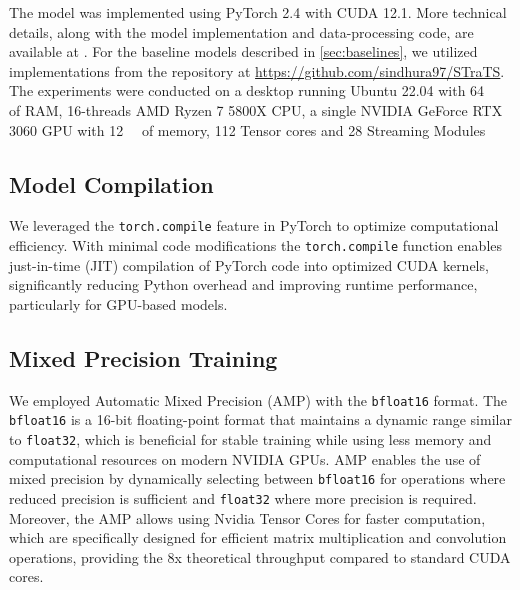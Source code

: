 The model was implemented using PyTorch 2.4 with CUDA 12.1. More technical details, along with the model implementation and data-processing code, are available at . For the baseline models described in \cref{sec:baselines}, we utilized implementations from the repository at \url{https://github.com/sindhura97/STraTS}. The experiments were conducted on a desktop running Ubuntu 22.04 with \qty{64}{\giga\byte} of RAM, 16-threads AMD Ryzen 7 5800X CPU, a single NVIDIA GeForce RTX 3060 GPU with \qty{12}{\giga\byte} of memory, \num{112} Tensor cores and \num{28} Streaming Modules

\subsection{Model Compilation}

We leveraged the \texttt{torch.compile} feature in PyTorch to optimize computational efficiency. With minimal code modifications the \texttt{torch.compile} function enables just-in-time (JIT) compilation of PyTorch code into optimized CUDA kernels, significantly reducing Python overhead and improving runtime performance, particularly for GPU-based models.

\subsection{Mixed Precision Training}

We employed Automatic Mixed Precision (AMP) with the \texttt{bfloat16} format. The \texttt{bfloat16} is a 16-bit floating-point format that maintains a dynamic range similar to \texttt{float32}, which is beneficial for stable training while using less memory and computational resources on modern NVIDIA GPUs. AMP enables the use of mixed precision by dynamically selecting between \texttt{bfloat16} for operations where reduced precision is sufficient and \texttt{float32} where more precision is required. Moreover, the AMP allows using Nvidia Tensor Cores for faster computation, which are specifically designed for efficient matrix multiplication and convolution operations, providing the 8x theoretical throughput compared to standard CUDA cores.

%

